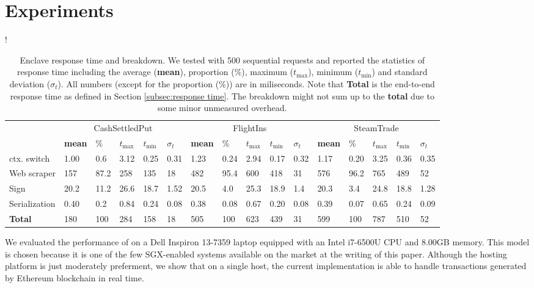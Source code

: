 \section{Experiments}
\label{sec:experiments}

\begin{table*}
\resizebox{\linewidth} {!}{
\begin{tabular}{l|lllll|lllll|lllll}
\toprule
& \multicolumn{5}{c|}{\sf CashSettledPut} &
  \multicolumn{5}{c|}{\sf FlightIns} &
  \multicolumn{5}{c}{\sf SteamTrade} \\
    & \textbf{mean} & \% & $t_{\max}$ & $t_{\min}$ & $\sigma_t$ & \textbf{mean}
    & \% & $t_{\max}$ & $t_{\min}$ & $\sigma_t$ & \textbf{mean} & \% & $t_{\max}$
    & $t_{\min}$ & $\sigma_t$\\
\midrule
    ctx. switch & 1.00 & 0.6 & 3.12 & 0.25 & 0.31 
                & 1.23 & 0.24 & 2.94 & 0.17 & 0.32 
                & 1.17 & 0.20 & 3.25 & 0.36 & 0.35\\
    Web scraper & 157  & 87.2 & 258 & 135 & 18 
                & 482  & 95.4 & 600 & 418 & 31 
                & 576  & 96.2 & 765 & 489 & 52\\
    Sign        & 20.2 & 11.2 & 26.6 & 18.7 & 1.52 
                & 20.5 & 4.0 & 25.3 & 18.9 & 1.4 
                & 20.3 & 3.4 & 24.8 & 18.8 & 1.28\\
    Serialization 
                & 0.40 & 0.2 & 0.84 & 0.24 & 0.08 
                & 0.38 & 0.08 & 0.67 & 0.20 & 0.08 
                & 0.39 & 0.07 & 0.65 & 0.24 & 0.09\\
\midrule
\midrule
    \textbf{Total} 
                & 180 & 100 & 284 & 158 & 18 
                & 505 & 100 & 623 & 439 & 31 
                & 599 & 100 & 787 & 510 & 52 \\
\bottomrule	
\end{tabular}
}
\caption{Enclave response time and breakdown. 
We tested \tc with 500 sequential requests and reported
the statistics of response time including 
the average ({\bf mean}), proportion (\%), maximum ($t_{\max}$),
minimum ($t_{\min}$) and standard deviation ($\sigma_t$).
All numbers (except for the proportion (\%)) are in miliseconds.
Note that {\bf Total} is the end-to-end response time as 
defined in Section \ref{subsec:response time}. The breakdown
might not sum up to the {\bf total} due to
some minor unmeasured overhead.}
\label{tab:eval_profiling}
\end{table*}

We evaluated the performance of \tc on a Dell Inspiron 13-7359 laptop equipped
with an Intel i7-6500U CPU and 8.00GB memory.  This model is chosen 
because it is one of the few SGX-enabled systems available on the market at the
writing of this paper. Although the hosting platform is just moderately preferment, we
show that on a single host, the current implementation is able to handle 
transactions generated by Ethereum blockchain in real time. 


